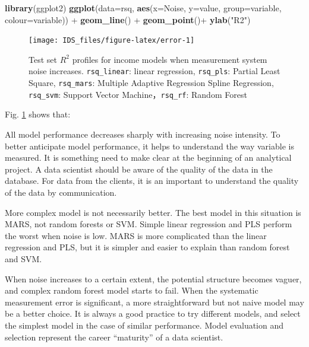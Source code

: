 \documentclass[12pt,]{krantz}
\newenvironment{Shaded}{\begin{snugshade}}{\end{snugshade}}
\newcommand{\KeywordTok}[1]{\textcolor[rgb]{0.13,0.29,0.53}{\textbf{{#1}}}}
\newcommand{\DataTypeTok}[1]{\textcolor[rgb]{0.13,0.29,0.53}{{#1}}}
\newcommand{\StringTok}[1]{\textcolor[rgb]{0.31,0.60,0.02}{{#1}}}
\newcommand{\NormalTok}[1]{{#1}}
\theoremstyle{definition}
\theoremstyle{definition}
\theoremstyle{remark}
\begin{document}
\begin{Shaded}
\begin{Highlighting}[]
\KeywordTok{library}\NormalTok{(ggplot2)}
\KeywordTok{ggplot}\NormalTok{(}\DataTypeTok{data=}\NormalTok{rsq, }\KeywordTok{aes}\NormalTok{(}\DataTypeTok{x=}\NormalTok{Noise, }\DataTypeTok{y=}\NormalTok{value, }\DataTypeTok{group=}\NormalTok{variable, }\DataTypeTok{colour=}\NormalTok{variable)) +}
\StringTok{    }\KeywordTok{geom_line}\NormalTok{() +}
\StringTok{    }\KeywordTok{geom_point}\NormalTok{()+}
\StringTok{  }\KeywordTok{ylab}\NormalTok{(}\StringTok{"R2"}\NormalTok{) }
\end{Highlighting}
\end{Shaded}

\begin{figure}

{\centering \texttt{[image: IDS\_files/figure-latex/error-1]} 

}

\caption{Test set \(R^2\) profiles for income models when
measurement system noise increases. \texttt{rsq\_linear}: linear
regression, \texttt{rsq\_pls}: Partial Least Square, \texttt{rsq\_mars}:
Multiple Adaptive Regression Spline Regression, \texttt{rsq\_svm}:
Support Vector Machine，\texttt{rsq\_rf}: Random Forest}\label{fig:error}
\end{figure}

Fig. \ref{fig:error} shows that:

All model performance decreases sharply with increasing noise intensity.
To better anticipate model performance, it helps to understand the way
variable is measured. It is something need to make clear at the
beginning of an analytical project. A data scientist should be aware of
the quality of the data in the database. For data from the clients, it
is an important to understand the quality of the data by communication.

More complex model is not necessarily better. The best model in this
situation is MARS, not random forests or SVM. Simple linear regression
and PLS perform the worst when noise is low. MARS is more complicated
than the linear regression and PLS, but it is simpler and easier to
explain than random forest and SVM.

When noise increases to a certain extent, the potential structure
becomes vaguer, and complex random forest model starts to fail. When the
systematic measurement error is significant, a more straightforward but
not naive model may be a better choice. It is always a good practice to
try different models, and select the simplest model in the case of
similar performance. Model evaluation and selection represent the career
``maturity'' of a data scientist.
\end{document}

